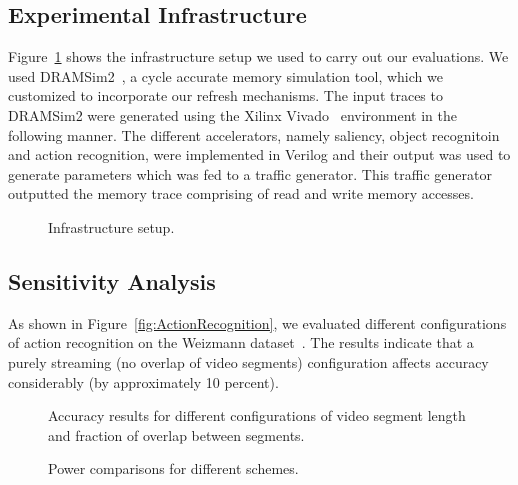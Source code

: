 \subsection{Experimental Infrastructure}
Figure~\ref{fig:experimental-setup} shows the infrastructure setup we used to carry out our evaluations.
We used DRAMSim2~\cite{DRAMsim2}, a cycle accurate memory simulation tool, which we customized to incorporate our refresh mechanisms. 
The input traces to DRAMSim2 were generated using the Xilinx Vivado~\cite{vivado} environment in the following manner.
The different accelerators, namely saliency, object recognitoin and action recognition, were implemented in Verilog and their output was used to generate parameters which was fed to a traffic generator.
This traffic generator outputted the memory trace comprising of read and write memory accesses.

\begin{figure}[ht!]
\centering
{}
\caption{\label{fig:experimental-setup} Infrastructure setup.}
\end{figure}

\subsection{Sensitivity Analysis}
As shown in Figure~\ref{fig:ActionRecognition}, we evaluated different configurations of action recognition on the Weizmann dataset~\cite{Weizmann}. The results indicate that a purely streaming (no overlap of video segments) configuration affects accuracy considerably (by approximately 10 percent).  

\begin{figure}[ht!]
\centering
{}
\caption{\label{fig:ActionRecogntion} Accuracy results for different configurations of video segment length and fraction of overlap between segments.}
\end{figure}

\begin{figure}[ht!]
\centering
{}
\caption{\label{fig:PowerResults} Power comparisons for different schemes.}
\end{figure}

